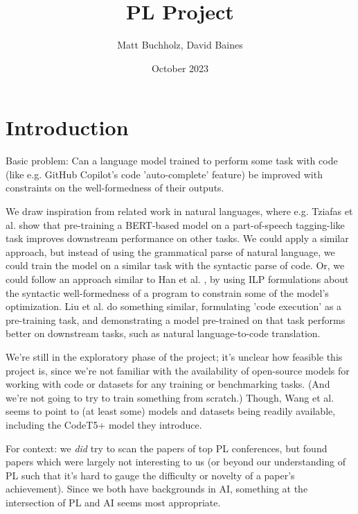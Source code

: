 \documentclass[11pt]{exam}
\title{PL Project}
\author{Matt Buchholz, David Baines }
\date{October 2023}
\begin{document}
\maketitle

\section{Introduction}

 Basic problem: Can a language model trained to perform some task with code (like e.g. GitHub Copilot's code 'auto-complete' feature) be improved with constraints on the well-formedness of their outputs.

  We draw inspiration from related work in natural languages, where e.g. Tziafas et al.  \cite{Tziafas} show that pre-training a BERT-based model on a part-of-speech tagging-like task improves downstream performance on other tasks. We could apply a similar approach, but instead of using the grammatical parse of natural language, we could train the model on a similar task with the syntactic parse of code. Or, we could follow an approach similar to Han et al. \cite{han-etal-2019-joint}, by using ILP formulations about the syntactic well-formedness of a program to constrain some of the model's optimization.
  Liu et al. \cite{liu2023code} do something similar, formulating 'code execution' as a pre-training task, and demonstrating a model pre-trained on that task performs better on downstream tasks, such as natural language-to-code translation.

  We're still in the exploratory phase of the project; it's unclear how feasible this project is, since we're not familiar with the availability of open-source models for working with code or datasets for any training or benchmarking tasks. (And we're not going to try to train something from scratch.) Though, Wang et al. \cite{wang2023codet5} seems to point to (at least some) models and datasets being readily available, including the CodeT5+ model they introduce.


  For context: we \emph{did} try to scan the papers of top PL conferences, but found papers which were largely not interesting to us (or beyond our understanding of PL such that it's hard to gauge the difficulty or novelty of a paper's achievement). Since we both have backgrounds in AI, something at the intersection of PL and AI seems most appropriate.


\end{document}
